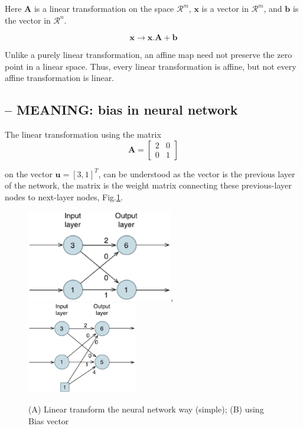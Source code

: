Here $\mathbf{A}$ is a linear transformation on the space $\mathcal{R}^m$,
$\mathbf{x}$ is a vector in $\mathcal{R}^m$, and $\mathbf{b}$ is the vector in
$\mathcal{R}^n$.

\begin{equation}
\mathbf{x} \longrightarrow \mathbf{x.A + b}
\end{equation}

Unlike a purely linear transformation, an affine map need not preserve the zero
point in a linear space. Thus, every linear transformation is affine, but not
every affine transformation is linear.

\subsection{-- MEANING: bias in neural network}
\label{sec:affine-transformation-neural-network}

The linear transformation using the matrix 
\begin{equation}
\mathbf{A} = \left[
\begin{array}{cc}
2 & 0 \\
0 & 1
\end{array}\right] 
\end{equation}

on the vector $\mathbf{u} = [3, 1]^T$, can be understood as the vector is the
previous layer of the network, the matrix is the weight matrix connecting these
previous-layer nodes to next-layer nodes, Fig.\ref{fig:lineartransform_neuralnet}.

\begin{figure}[hbt]
  \centerline{\includegraphics[height=4cm,
    angle=0]{./images/lineartransform_neuralnet.eps},
    \includegraphics[height=4cm,
    angle=0]{./images/lineartransform_neuralnet_with_bias.eps}}
\caption{(A) Linear transform the neural network way (simple); (B) using Bias vector}
\label{fig:lineartransform_neuralnet}
\end{figure}

